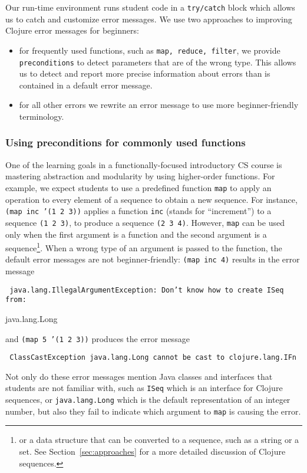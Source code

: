 \documentclass[submission,copyright,creativecommons]{eptcs}
\newcommand{\clocode}[1]{{\tt {#1}}}
\begin{document}
Our run-time environment runs student code in a \clocode{try/catch} block which allows us to catch and customize error messages. 
We use two approaches to improving Clojure error messages for beginners:
\begin{itemize}
\item for frequently used functions, such as \clocode{map, reduce, filter}, we provide \clocode{preconditions}  to detect parameters that are of the wrong type. This allows us to detect and report more precise information about errors than is contained in a default error message. 
\item for all other errors we rewrite an error message to use more beginner-friendly terminology. 
\end{itemize}

\subsubsection{Using preconditions for commonly used functions}\label{subsub:pre-cond}
One of the learning goals in a functionally-focused introductory CS course is mastering abstraction and modularity by using higher-order functions. For example, we expect students to use a predefined function \clocode{map} to apply an operation to every element of a sequence to obtain a new sequence. For instance, \clocode{(map inc '(1 2 3))} applies a function \clocode{inc} (stands for ``increment'') to a sequence \clocode{(1 2 3)}, to produce a sequence \clocode{(2 3 4)}. However, \clocode{map} can be used only when the first argument is a function and the second argument is a sequence\footnote{or a data structure that can be converted to a sequence, such as a string or a set. See Section~\ref{sec:approaches} for a more detailed discussion of Clojure sequences.}. When a wrong type of an argument is passed to the function, the default error messages are not beginner-friendly:
\clocode{(map inc 4)} results in the error message

{\tt
java.lang.IllegalArgumentException: Don't know how to create ISeq from: 

java.lang.Long
}

\noindent
and \clocode{(map 5 '(1 2 3))} produces the error message

{\tt 
ClassCastException java.lang.Long cannot be cast to clojure.lang.IFn  
}

Not only do these error messages mention Java classes and interfaces that students are not familiar with, such as {\tt ISeq} which is an interface for Clojure sequences, or {\tt java.lang.Long} which is the default representation of an integer number, but also they fail to indicate which argument to \clocode{map} is causing the error. 
\end{document}
